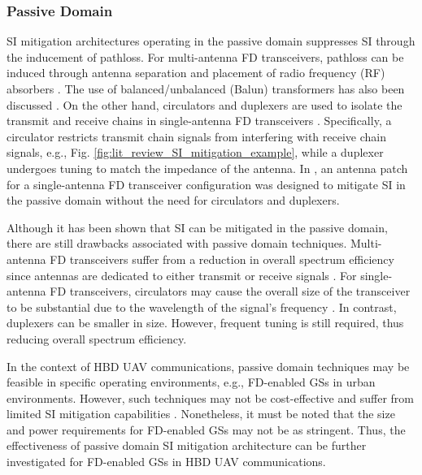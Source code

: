 \subsubsection{Passive Domain}
SI mitigation architectures operating in the passive domain suppresses SI through the inducement of pathloss. For multi-antenna FD transceivers, pathloss can be induced through antenna separation and placement of radio frequency (RF) absorbers \cite{everett2014passive}. The use of balanced/unbalanced (Balun) transformers has also been discussed \cite{jain2011practical}. On the other hand, circulators and duplexers are used to isolate the transmit and receive chains in single-antenna FD transceivers \cite{korpi2016full}. Specifically, a circulator restricts transmit chain signals from interfering with receive chain signals, e.g., Fig. \ref{fig:lit_review_SI_mitigation_example}, while a duplexer undergoes tuning to match the impedance of the antenna. In \cite{amjad2018low}, an antenna patch for a single-antenna FD transceiver configuration was designed to mitigate SI in the passive domain without the need for circulators and duplexers.

Although it has been shown that SI can be mitigated in the passive domain, there are still drawbacks associated with passive domain techniques. Multi-antenna FD transceivers suffer from a reduction in overall spectrum efficiency since antennas are dedicated to either transmit or receive signals \cite{amjad2018low}. For single-antenna FD transceivers, circulators may cause the overall size of the transceiver to be substantial due to the wavelength of the signal's frequency \cite{korpi2016full}. In contrast, duplexers can be smaller in size. However, frequent tuning is still required, thus reducing overall spectrum efficiency. 

In the context of HBD UAV communications, passive domain techniques may be feasible in specific operating environments, e.g., FD-enabled GSs in urban environments. However, such techniques may not be cost-effective and suffer from limited SI mitigation capabilities \cite{amjad2018low}. Nonetheless, it must be noted that the size and power requirements for FD-enabled GSs may not be as stringent. Thus, the effectiveness of passive domain SI mitigation architecture can be further investigated for FD-enabled GSs in HBD UAV communications.

